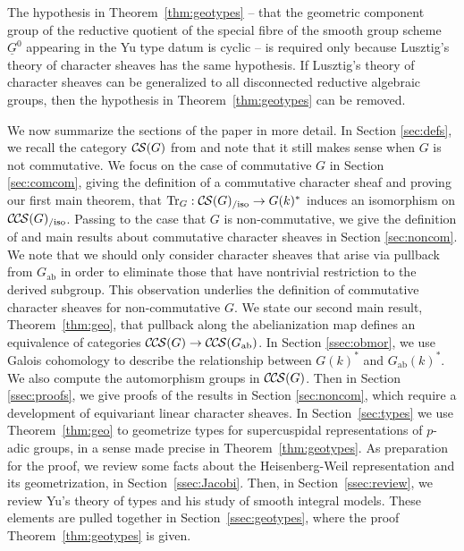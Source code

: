 \documentclass[10pt]{amsart}
\theoremstyle{plain}
\theoremstyle{definition}
\newcommand{\Fq}{k}
\DeclareMathOperator{\trace}{Tr}
\newcommand{\ab}{_{\operatorname{ab}}}
\newcommand{\trFrob}[1]{t_{#1}}
\DeclareMathOperator{\Tr}{Tr}
\newcommand{\TrFrob}[1]{\Tr_{#1}}
\newcommand{\cs}[1]{{\mathcal{#1}}}
\newcommand{\CS}{{\mathcal{C\hskip-0.8pt S}}}
\newcommand{\CCS}{{\mathcal{C\hskip-.8pt C\hskip-0.8pt S}}}
\newcommand{\CSiso}[1]{\CS(#1)_{/\text{iso}}}
\newcommand{\CCSiso}[1]{\CCS(#1)_{/\text{iso}}}
\begin{document}
The hypothesis in Theorem~\ref{thm:geotypes} -- that the geometric component group of the reductive quotient of the special fibre of the smooth group scheme $\underline{G}^0$ appearing in the Yu type datum is cyclic --  is required only because Lusztig's theory of character sheaves has the same hypothesis.
If Lusztig's theory of character sheaves can be generalized to all disconnected reductive algebraic groups, then the hypothesis in Theorem~\ref{thm:geotypes} can be removed.
\bigskip

We now summarize the sections of the paper in more detail.
%
In Section \ref{sec:defs}, we recall the category $\CS(G)$ from \cite{cunningham-roe:13a} and note that it still makes sense when $G$ is not commutative.  
%
We focus on the case of commutative $G$ in Section \ref{sec:comcom},
giving the definition of a commutative character sheaf and proving our first main theorem, that
$\TrFrob{G} : \CSiso{G} \to G(k)^*$ induces an isomorphism on $\CCSiso{G}$.
%
Passing to the case that $G$ is non-commutative, we give the definition of and main results about commutative character sheaves in Section \ref{sec:noncom}.  
We note that we should only consider character sheaves that arise via pullback from $G\ab$ in order to eliminate those that have nontrivial restriction to the derived subgroup.  
This observation underlies the definition of commutative character sheaves for non-commutative $G$.  
We state our second main result, Theorem~\ref{thm:geo}, that pullback along the abelianization map defines an equivalence of categories $\CCS(G) \to \CCS(G\ab)$.
In Section \ref{ssec:obmor}, we use Galois cohomology to describe the relationship between $G(k)^*$ and $G\ab(k)^*$.  
We also compute the automorphism groups in $\CCS(G)$.
Then in Section \ref{ssec:proofs}, we give proofs of the results in Section \ref{sec:noncom}, which require a development of equivariant linear character sheaves. 
% 
In Section~\ref{sec:types} we use Theorem~\ref{thm:geo} to geometrize types for supercuspidal representations of $p$-adic groups, in a sense made precise in Theorem~\ref{thm:geotypes}. 
As preparation for the proof, we review some facts about the Heisenberg-Weil representation and its geometrization, in Section~\ref{ssec:Jacobi}.
Then, in Section~\ref{ssec:review}, we review Yu's theory of types and his study of smooth integral models.  
These elements are pulled together in Section~\ref{ssec:geotypes}, where the proof Theorem~\ref{thm:geotypes} is given.
\end{document}
